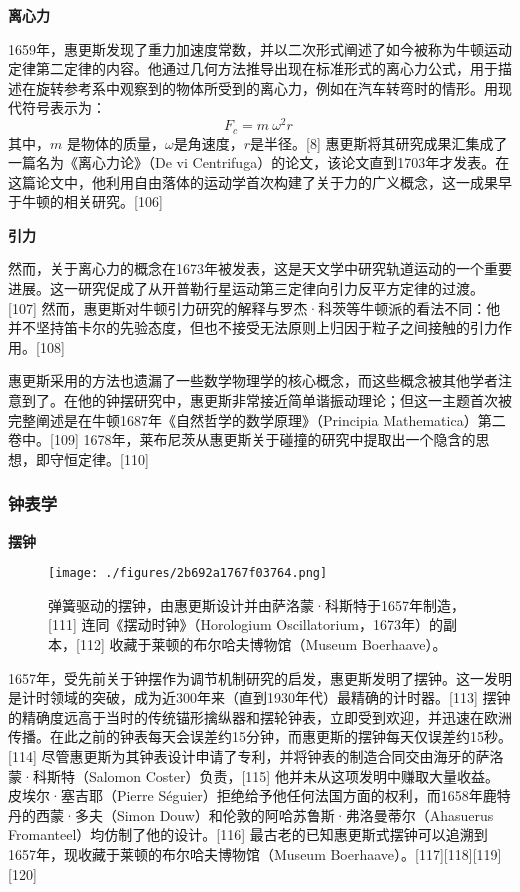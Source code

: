 \textbf{离心力}

1659年，惠更斯发现了重力加速度常数，并以二次形式阐述了如今被称为牛顿运动定律第二定律的内容。他通过几何方法推导出现在标准形式的离心力公式，用于描述在旋转参考系中观察到的物体所受到的离心力，例如在汽车转弯时的情形。用现代符号表示为：
\[{\displaystyle F_{c}={m\ \omega ^{2}}{r}}~\]
其中，\(m\) 是物体的质量，\(\omega\)是角速度，\(r\)是半径。[8] 惠更斯将其研究成果汇集成了一篇名为《离心力论》（De vi Centrifuga）的论文，该论文直到1703年才发表。在这篇论文中，他利用自由落体的运动学首次构建了关于力的广义概念，这一成果早于牛顿的相关研究。[106]

\textbf{引力}

然而，关于离心力的概念在1673年被发表，这是天文学中研究轨道运动的一个重要进展。这一研究促成了从开普勒行星运动第三定律向引力反平方定律的过渡。[107] 然而，惠更斯对牛顿引力研究的解释与罗杰·科茨等牛顿派的看法不同：他并不坚持笛卡尔的先验态度，但也不接受无法原则上归因于粒子之间接触的引力作用。[108]

惠更斯采用的方法也遗漏了一些数学物理学的核心概念，而这些概念被其他学者注意到了。在他的钟摆研究中，惠更斯非常接近简单谐振动理论；但这一主题首次被完整阐述是在牛顿1687年《自然哲学的数学原理》（Principia Mathematica）第二卷中。[109] 1678年，莱布尼茨从惠更斯关于碰撞的研究中提取出一个隐含的思想，即守恒定律。[110]
\subsubsection{钟表学}
\textbf{摆钟}
\begin{figure}[ht]
\centering
\texttt{[image: ./figures/2b692a1767f03764.png]}
\caption{弹簧驱动的摆钟，由惠更斯设计并由萨洛蒙·科斯特于1657年制造，[111] 连同《摆动时钟》（Horologium Oscillatorium，1673年）的副本，[112] 收藏于莱顿的布尔哈夫博物馆（Museum Boerhaave）。} \label{fig_HGS_10}
\end{figure}
1657年，受先前关于钟摆作为调节机制研究的启发，惠更斯发明了摆钟。这一发明是计时领域的突破，成为近300年来（直到1930年代）最精确的计时器。[113] 摆钟的精确度远高于当时的传统锚形擒纵器和摆轮钟表，立即受到欢迎，并迅速在欧洲传播。在此之前的钟表每天会误差约15分钟，而惠更斯的摆钟每天仅误差约15秒。[114] 尽管惠更斯为其钟表设计申请了专利，并将钟表的制造合同交由海牙的萨洛蒙·科斯特（Salomon Coster）负责，[115] 他并未从这项发明中赚取大量收益。皮埃尔·塞吉耶（Pierre Séguier）拒绝给予他任何法国方面的权利，而1658年鹿特丹的西蒙·多夫（Simon Douw）和伦敦的阿哈苏鲁斯·弗洛曼蒂尔（Ahasuerus Fromanteel）均仿制了他的设计。[116] 最古老的已知惠更斯式摆钟可以追溯到1657年，现收藏于莱顿的布尔哈夫博物馆（Museum Boerhaave）。[117][118][119][120]

